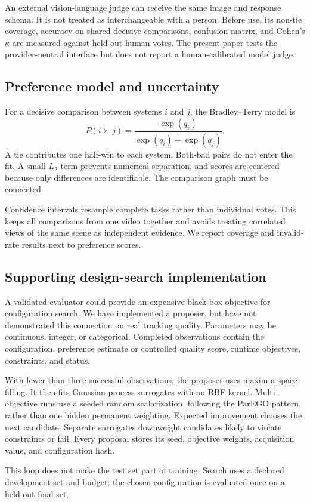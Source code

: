 \documentclass[10pt,twocolumn]{article}
\begin{document}
An external vision-language judge can receive the same image and response schema. It is not treated as interchangeable with a person. Before use, its non-tie coverage, accuracy on shared decisive comparisons, confusion matrix, and Cohen's $\kappa$ are measured against held-out human votes. The present paper tests the provider-neutral interface but does not report a human-calibrated model judge.

\subsection{Preference model and uncertainty}
For a decisive comparison between systems $i$ and $j$, the Bradley--Terry model is
\[
P(i \succ j)=\frac{\exp(q_i)}{\exp(q_i)+\exp(q_j)}.
\]
A tie contributes one half-win to each system. Both-bad pairs do not enter the fit. A small $L_2$ term prevents numerical separation, and scores are centered because only differences are identifiable. The comparison graph must be connected.

Confidence intervals resample complete tasks rather than individual votes. This keeps all comparisons from one video together and avoids treating correlated views of the same scene as independent evidence. We report coverage and invalid-rate results next to preference scores.

\subsection{Supporting design-search implementation}
A validated evaluator could provide an expensive black-box objective for configuration search. We have implemented a proposer, but have not demonstrated this connection on real tracking quality. Parameters may be continuous, integer, or categorical. Completed observations contain the configuration, preference estimate or controlled quality score, runtime objectives, constraints, and status.

With fewer than three successful observations, the proposer uses maximin space filling. It then fits Gaussian-process surrogates with an RBF kernel. Multi-objective runs use a seeded random scalarization, following the ParEGO pattern, rather than one hidden permanent weighting. Expected improvement chooses the next candidate. Separate surrogates downweight candidates likely to violate constraints or fail. Every proposal stores its seed, objective weights, acquisition value, and configuration hash.

This loop does not make the test set part of training. Search uses a declared development set and budget; the chosen configuration is evaluated once on a held-out final set.
\end{document}
